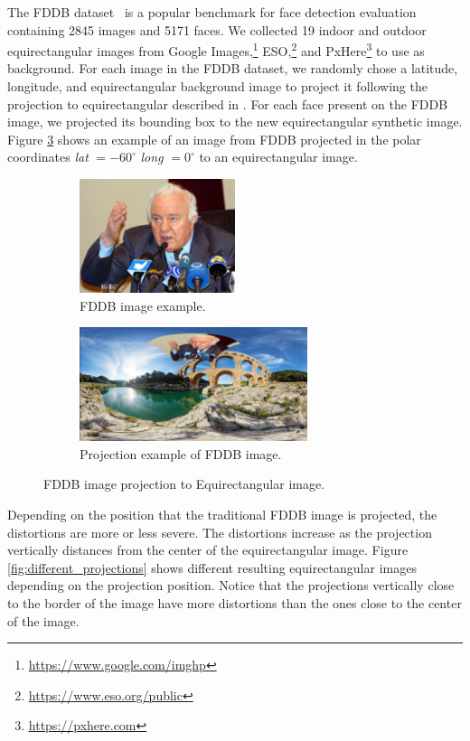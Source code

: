 The FDDB dataset~\cite{jain2010fddb} is a popular benchmark for face detection evaluation containing 2845 images and 5171 faces. We collected 19 indoor and outdoor equirectangular images from Google Images,\footnote{\url{https://www.google.com/imghp}} ESO,\footnote{\url{https://www.eso.org/public}} and PxHere\footnote{\url{https://pxhere.com}} to use as background.
For each image in the FDDB dataset, we randomly chose a latitude, longitude, and equirectangular background image to project it following the projection to equirectangular described in \cite{su2017learning}.
For each face present on the FDDB image, we projected its bounding box to the new equirectangular synthetic image. Figure \ref{fig:authoring_fddb_proj} shows an example of an image from FDDB projected in the polar coordinates \emph{lat} $ = -60^{\circ}$ \emph{long} $ = 0^{\circ}$ to an equirectangular image.

\begin{figure}[!ht]
\centering
    \begin{subfigure}{0.4\linewidth}
        \centering
        \includegraphics[height=9em]{img/video360/face_pre.png}
        \caption{FDDB image example.}
        \label{subfig:face_pre}
    \end{subfigure}\hfill
    \begin{subfigure}{0.55\linewidth}
        \centering
         \includegraphics[height=9em]{img/video360/face_pos.png}
        \caption{Projection example of FDDB image.}
        \label{subfig:face_pos}
    \end{subfigure}

\caption{FDDB image projection to Equirectangular image.}
\label{fig:authoring_fddb_proj}
\end{figure}

Depending on the position that the traditional FDDB image is projected, the distortions are more or less severe. The distortions increase as the projection vertically distances from the center of the equirectangular image. Figure \ref{fig:different_projections} shows different resulting equirectangular images depending on the projection position. Notice that the projections vertically close to the border of the image have more distortions than the ones close to the center of the image.

